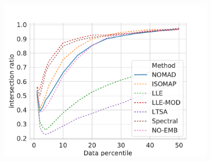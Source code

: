 \documentclass[twoside,11pt]{article}
\begin{document}
\begin{figure}
\begin{subfigure}{\textwidth}
\begin{footnotesize}
\begin{tabu}
		\includegraphics[width=\linewidth]{figures/geodesics/geodesics_moons_orthogonal_noise010_label0} \\


\end{tabu}
\end{footnotesize}
\end{subfigure}
\end{figure}
\end{document}

